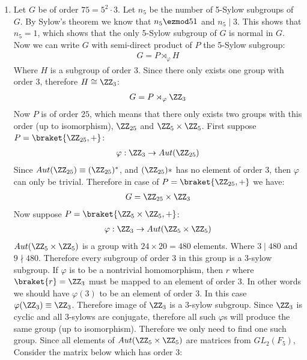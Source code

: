 \begin{enumerate}[label=]
    \item
        Let $G$ be of order $75 = 5^2 \cdot 3$. Let $n_5$ be the number of 5-Sylow subgroups of $G$. By Sylow's theorem we know that $n_5 \ezmod 5 1$ and $n_5 \mid 3$. This shows that $n_5 = 1$, which shows that the only 5-Sylow subgroup of $G$ is normal in $G$. Now we can write $G$ with semi-direct product of $P$ the 5-Sylow subgroup:
        \begin{gather*}
            G = P \rtimes_\varphi H
        \end{gather*}
        Where $H$ is a subgroup of order 3. Since there only exists one group with order 3, therefore $H \cong \ZZ_3$:
        \begin{gather*}
            G = P \rtimes_\varphi \ZZ_3
        \end{gather*}
        Now $P$ is of order $25$, which means that there only exists two groups with this order (up to isomorphism), $\ZZ_{25}$ and $\ZZ_5 \times \ZZ_5$.
        First suppose $P = \braket{\ZZ_{25}, +}$:
        \begin{gather*}
            \varphi: \ZZ_3 \to Aut(\ZZ_{25})
        \end{gather*}
        Since $Aut(\ZZ_{25}) \equiv (\ZZ_{25})^*$, and $(\ZZ_{25})*$ has no element of order 3, then $\varphi$ can only be trivial. Therefore in case of $P = \braket{\ZZ_{25}, +}$ we have:
        \begin{gather*}
            G = \ZZ_{25} \times \ZZ_3
        \end{gather*}
        Now suppose $P = \braket{\ZZ_5 \times \ZZ_5, +}$:
        \begin{gather*}
            \varphi: \ZZ_3 \to Aut(\ZZ_5 \times \ZZ_5)
        \end{gather*}
        $Aut(\ZZ_5 \times \ZZ_5)$ is a group with $24 \times 20 = 480$ elements. Where $3 \mid 480$ and $9 \nmid 480$. Therefore every subgroup of order 3 in this group is a 3-sylow subgroup. If $\varphi$ is to be a nontrivial homomorphism, then $r$ where $\braket{r} = \ZZ_3$ must be mapped to an element of order 3. In other words we should have $\varphi(3)$ to be an element of order 3. In this case $\varphi(\ZZ_3) \equiv \ZZ_3$. Therefore image of $\ZZ_3$ is a 3-sylow subgroup. Since $\ZZ_3$ is cyclic and all 3-sylows are conjugate, therefore all such $\varphi$s will produce the same group (up to isomorphism). Therefore we only need to find one such group. Since all elements of $Aut(\ZZ_5 \times \ZZ_5)$ are matrices from $GL_2(F_5)$, Consider the matrix below which has order 3:

\end{enumerate}
